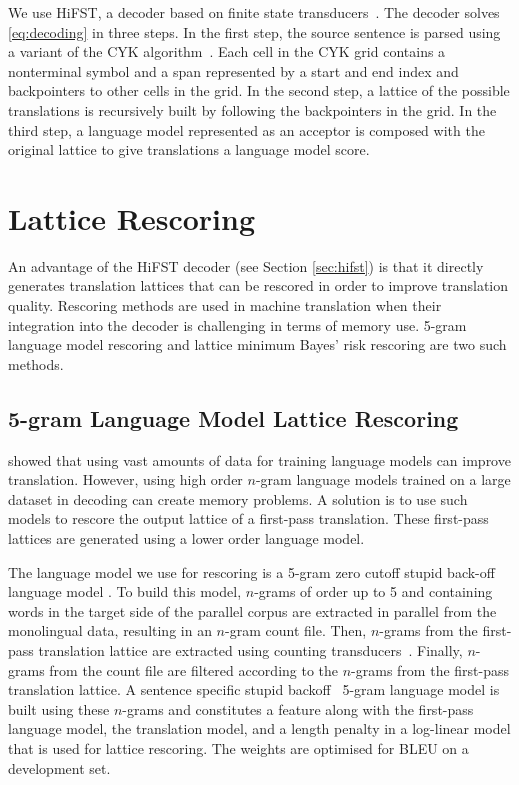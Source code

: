 We use HiFST, a decoder based on finite state transducers~\citep{iglesias-degispert-banga-byrne:2009:NAACL}.
The decoder solves \autoref{eq:decoding} in three steps. In the first step, the source
sentence is parsed using a variant of the CYK algorithm~\citep{chappelier-rahman:1998:TAPD}. Each cell in the CYK
grid contains a nonterminal symbol and a span represented by a start and
end index and backpointers to other cells in the grid. In the second step, a lattice of the possible translations 
is recursively built by following the backpointers in the grid.
In the third step, a language model represented as an acceptor is composed
with the original lattice to give translations a language model score.

\section{Lattice Rescoring}
\label{sec:rescoring}

An advantage of the HiFST decoder (see Section \ref{sec:hifst}) is that it directly %
generates translation lattices that can be rescored in order to improve translation quality.
Rescoring methods are used in machine translation when their integration into the decoder
is challenging in terms of memory use. 5-gram language model rescoring and lattice minimum
Bayes' risk rescoring are two such methods.

\subsection{5-gram Language Model Lattice Rescoring}
\label{sec:background5gRescoring}

\citet{brants-popat-xu-och-dean:2007:EMNLP-CoNLL} showed that using vast
amounts of data for training language models can improve translation. However,
using high order $n$-gram language models trained on
a large dataset in decoding can create memory problems. %
A solution is to use such models to rescore the output
lattice of a first-pass translation. These first-pass lattices are generated
using a lower
order language model.

The language model we use for rescoring is a 5-gram zero cutoff stupid back-off language model \cite{brants-popat-xu-och-dean:2007:EMNLP-CoNLL}.
To build this model, $n$-grams of order up to 5 and containing words in the target side of the parallel corpus 
are extracted in parallel from the monolingual data, resulting in an $n$-gram count file.
Then, $n$-grams from the first-pass translation lattice 
are extracted using counting transducers~\citep{allauzen:03}.
Finally, $n$-grams from the count file are filtered according to the $n$-grams from the first-pass 
translation lattice. A sentence specific stupid backoff~\citep{brants-popat-xu-och-dean:2007:EMNLP-CoNLL}
5-gram language model is built using these $n$-grams and constitutes a feature along with the first-pass
language model, the translation model, and a length penalty in a log-linear model that is used
for lattice rescoring. The weights are optimised for BLEU on a development set.

